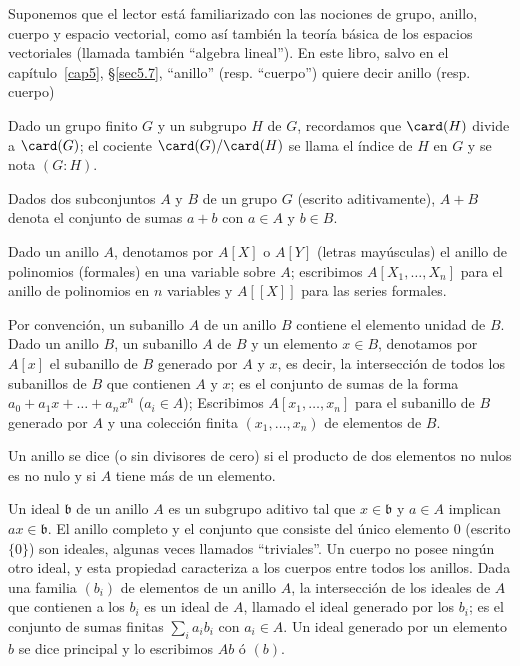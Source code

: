\documentclass[bibtotoc,leqno,spanish]{amsbook}
\let\emph\relax %
\newcommand{\idl}[1]{\mathfrak{#1}}
\numberwithin{equation}{section}
\theoremstyle{note}
\theoremstyle{note}
\theoremstyle{rem}
\numberwithin{theorem}{section}
\numberwithin{proposition}{section}
\numberwithin{definition}{section}
\numberwithin{lemma}{section}
\numberwithin{corollary}{section}
\numberwithin{example}{section}
\numberwithin{footnote}{section}%
\begin{document}
Suponemos que el lector est\'a familiarizado
con las nociones de grupo, anillo, cuerpo y espacio vectorial,
como as\'i tambi\'en la teor\'ia b\'asica de los espacios vectoriales
(llamada tambi\'en ``algebra lineal''). En este libro, salvo en el cap\'itulo~\ref{cap5},
\S\ref{sec5.7}, ``anillo'' (resp. ``cuerpo'') quiere decir anillo (resp. cuerpo)
\emph{conmutativo y con unidad.}

Dado un grupo finito $G$ y un subgrupo $H$ de $G$, recordamos que $\card(H)$ divide
a $\card(G)$; el cociente $\card(G)/\card(H)$ se llama el \'indice de $H$ en $G$ y
se nota $(G:H)$.

Dados dos subconjuntos $A$ y $B$ de un grupo $G$ (escrito aditivamente), $A+B$
denota el conjunto de sumas $a+b$ con $a\in A$ y $b\in B$.

Dado un anillo $A$, denotamos por $A[X]$ o $A[Y]$ (letras may\'usculas)
el anillo de polinomios (formales) en una variable sobre $A$; escribimos
$A[X_{1},\dots,X_{n}]$ para el anillo de polinomios en $n$ variables y $A[[X]]$ para las
series formales.

Por convenci\'on, un subanillo $A$ de un anillo $B$ contiene el elemento unidad de $B$.
Dado un anillo $B$, un subanillo $A$ de $B$ y un elemento $x\in B$, denotamos por
$A[x]$ el subanillo de $B$ generado por $A$ y $x$, es decir, la intersecci\'on de todos
los subanillos de $B$ que contienen $A$ y $x$; es el conjunto de sumas de la forma
$a_{0}+a_{1}x+\dots+a_{n}x^{n}$ ($a_{i}\in A$); Escribimos $A[x_{1},\dots,x_{n}]$
para el subanillo de $B$ generado por $A$ y una colecci\'on finita $(x_{1},\dots,x_{n})$
de elementos de $B$.

Un anillo se dice \emph{dominio \'integro} (o sin divisores de cero) si el producto de dos
elementos no nulos es no nulo y si $A$ tiene m\'as de un elemento.

Un ideal $\idl{b}$ de un anillo $A$ es un subgrupo aditivo tal que $x\in\idl{b}$
y $a\in A$ implican $ax\in\idl{b}$. El anillo completo y el conjunto que consiste del
\'unico elemento $0$ (escrito $\{0\}$) son ideales, algunas veces llamados ``triviales''.
Un cuerpo no posee ning\'un otro ideal, y esta propiedad caracteriza a los cuerpos
entre todos los anillos. Dada una familia $(b_{i})$ de elementos de un anillo $A$, la intersecci\'on
de los ideales de $A$ que contienen a los $b_{i}$ es un ideal de $A$, llamado el ideal
generado por los $b_{i}$; es el conjunto de sumas finitas $\sum_{i}a_{i}b_{i}$ con $a_{i}\in A$.
Un ideal generado por un elemento $b$ se dice principal y lo escribimos $Ab$ \'o $(b)$.
\end{document}
